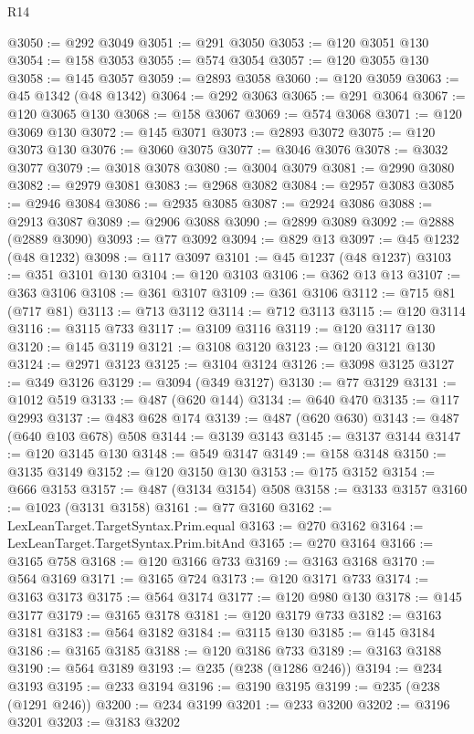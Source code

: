 \begin{lexlean}{R14}
\begin{coremodule}
{{{{{{{{{{{{{{{{{{{{{{{{{{{{{{{{{{{{{{{{{{{{{{{{{{{{{{{{{{{{{{{{{{{{{{{{{{{{{{{{{{{{{{{{{{{{{{{{{{{{{{{{{{@3050 := @292 @3049
@3051 := @291 @3050
@3053 := @120 @3051 @130
@3054 := @158 @3053
@3055 := @574 @3054
@3057 := @120 @3055 @130
@3058 := @145 @3057
@3059 := @2893 @3058
@3060 := @120 @3059
@3063 := @45 @1342 (@48 @1342)
@3064 := @292 @3063
@3065 := @291 @3064
@3067 := @120 @3065 @130
@3068 := @158 @3067
@3069 := @574 @3068
@3071 := @120 @3069 @130
@3072 := @145 @3071
@3073 := @2893 @3072
@3075 := @120 @3073 @130
@3076 := @3060 @3075
@3077 := @3046 @3076
@3078 := @3032 @3077
@3079 := @3018 @3078
@3080 := @3004 @3079
@3081 := @2990 @3080
@3082 := @2979 @3081
@3083 := @2968 @3082
@3084 := @2957 @3083
@3085 := @2946 @3084
@3086 := @2935 @3085
@3087 := @2924 @3086
@3088 := @2913 @3087
@3089 := @2906 @3088
@3090 := @2899 @3089
@3092 := @2888 (@2889 @3090)
@3093 := @77 @3092
@3094 := @829 @13
@3097 := @45 @1232 (@48 @1232)
@3098 := @117 @3097
@3101 := @45 @1237 (@48 @1237)
@3103 := @351 @3101 @130
@3104 := @120 @3103
@3106 := @362 @13 @13
@3107 := @363 @3106
@3108 := @361 @3107
@3109 := @361 @3106
@3112 := @715 @81 (@717 @81)
@3113 := @713 @3112
@3114 := @712 @3113
@3115 := @120 @3114
@3116 := @3115 @733
@3117 := @3109 @3116
@3119 := @120 @3117 @130
@3120 := @145 @3119
@3121 := @3108 @3120
@3123 := @120 @3121 @130
@3124 := @2971 @3123
@3125 := @3104 @3124
@3126 := @3098 @3125
@3127 := @349 @3126
@3129 := @3094 (@349 @3127)
@3130 := @77 @3129
@3131 := @1012 @519
@3133 := @487 (@620 @144)
@3134 := @640 @470
@3135 := @117 @2993
@3137 := @483 @628 @174
@3139 := @487 (@620 @630)
@3143 := @487 (@640 @103 @678) @508
@3144 := @3139 @3143
@3145 := @3137 @3144
@3147 := @120 @3145 @130
@3148 := @549 @3147
@3149 := @158 @3148
@3150 := @3135 @3149
@3152 := @120 @3150 @130
@3153 := @175 @3152
@3154 := @666 @3153
@3157 := @487 (@3134 @3154) @508
@3158 := @3133 @3157
@3160 := @1023 (@3131 @3158)
@3161 := @77 @3160
@3162 := LexLeanTarget.TargetSyntax.Prim.equal
@3163 := @270 @3162
@3164 := LexLeanTarget.TargetSyntax.Prim.bitAnd
@3165 := @270 @3164
@3166 := @3165 @758
@3168 := @120 @3166 @733
@3169 := @3163 @3168
@3170 := @564 @3169
@3171 := @3165 @724
@3173 := @120 @3171 @733
@3174 := @3163 @3173
@3175 := @564 @3174
@3177 := @120 @980 @130
@3178 := @145 @3177
@3179 := @3165 @3178
@3181 := @120 @3179 @733
@3182 := @3163 @3181
@3183 := @564 @3182
@3184 := @3115 @130
@3185 := @145 @3184
@3186 := @3165 @3185
@3188 := @120 @3186 @733
@3189 := @3163 @3188
@3190 := @564 @3189
@3193 := @235 (@238 (@1286 @246))
@3194 := @234 @3193
@3195 := @233 @3194
@3196 := @3190 @3195
@3199 := @235 (@238 (@1291 @246))
@3200 := @234 @3199
@3201 := @233 @3200
@3202 := @3196 @3201
@3203 := @3183 @3202
}}}}}}}}}}}}}}}}}}}}}}}}}}}}}}}}}}}}}}}}}}}}}}}}}}}}}}}}}}}}}}}}}}}}}}}}}}}}}}}}}}}}}}}}}}}}}}}}}}}}}}}}}}
\end{coremodule}
\end{lexlean}
